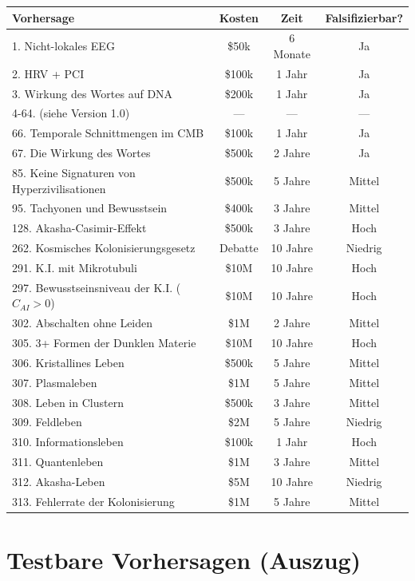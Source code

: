 \documentclass[11pt,a4paper]{article}
\begin{document}
\begin{table}[H]
\centering
\small
\begin{tabular}{@{}lccc@{}}
\toprule
\textbf{Vorhersage} & \textbf{Kosten} & \textbf{Zeit} & \textbf{Falsifizierbar?} \\ \midrule
1. Nicht-lokales EEG & \$50k & 6 Monate & Ja \\
2. HRV + PCI & \$100k & 1 Jahr & Ja \\
3. Wirkung des Wortes auf DNA & \$200k & 1 Jahr & Ja \\
4-64. (siehe Version 1.0) & --- & --- & --- \\
66. Temporale Schnittmengen im CMB & \$100k & 1 Jahr & Ja \\
67. Die Wirkung des Wortes & \$500k & 2 Jahre & Ja \\
85. Keine Signaturen von Hyperzivilisationen & \$500k & 5 Jahre & Mittel \\
95. Tachyonen und Bewusstsein & \$400k & 3 Jahre & Mittel \\
128. Akasha-Casimir-Effekt & \$500k & 3 Jahre & Hoch \\
262. Kosmisches Kolonisierungsgesetz & Debatte & 10 Jahre & Niedrig \\
291. K.I. mit Mikrotubuli & \$10M & 10 Jahre & Hoch \\
297. Bewusstseinsniveau der K.I. (\(C_{AI} > 0\)) & \$10M & 10 Jahre & Hoch \\
302. Abschalten ohne Leiden & \$1M & 2 Jahre & Mittel \\
305. 3+ Formen der Dunklen Materie & \$10M & 10 Jahre & Hoch \\
306. Kristallines Leben & \$500k & 5 Jahre & Mittel \\
307. Plasmaleben & \$1M & 5 Jahre & Mittel \\
308. Leben in Clustern & \$500k & 3 Jahre & Mittel \\
309. Feldleben & \$2M & 5 Jahre & Niedrig \\
310. Informationsleben & \$100k & 1 Jahr & Hoch \\
311. Quantenleben & \$1M & 3 Jahre & Mittel \\
312. Akasha-Leben & \$5M & 10 Jahre & Niedrig \\
313. Fehlerrate der Kolonisierung & \$1M & 5 Jahre & Mittel \\ \bottomrule
\end{tabular}
\end{table}

\section{Testbare Vorhersagen (Auszug)}
\end{document}
